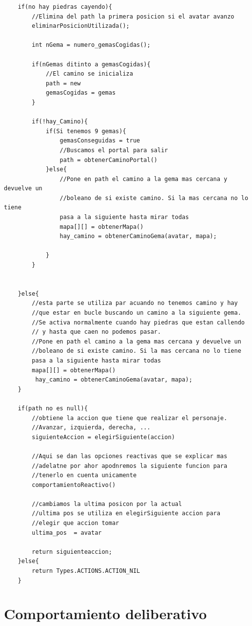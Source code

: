 \documentclass[titlepage]{article}
\begin{document}
	\begin{lstlisting}
	if(no hay piedras cayendo){
		//Elimina del path la primera posicion si el avatar avanzo
		eliminarPosicionUtilizada();
		
		int nGema = numero_gemasCogidas();
		
		if(nGemas ditinto a gemasCogidas){
			//El camino se inicializa
			path = new
			gemasCogidas = gemas
		}
		
		if(!hay_Camino){
			if(Si tenemos 9 gemas){
				gemasConseguidas = true
				//Buscamos el portal para salir
				path = obtenerCaminoPortal()
			}else{
				//Pone en path el camino a la gema mas cercana y devuelve un 
				//boleano de si existe camino. Si la mas cercana no lo tiene
				pasa a la siguiente hasta mirar todas
				mapa[][] = obtenerMapa()
				hay_camino = obtenerCaminoGema(avatar, mapa);
				
			}
		}
		
		
	}else{
		//esta parte se utiliza par acuando no tenemos camino y hay 
		//que estar en bucle buscando un camino a la siguiente gema.
		//Se activa normalmente cuando hay piedras que estan callendo
		// y hasta que caen no podemos pasar.
		//Pone en path el camino a la gema mas cercana y devuelve un 
		//boleano de si existe camino. Si la mas cercana no lo tiene
		pasa a la siguiente hasta mirar todas
		mapa[][] = obtenerMapa()
		 hay_camino = obtenerCaminoGema(avatar, mapa);
	}
	
	if(path no es null){
		//obtiene la accion que tiene que realizar el personaje.
		//Avanzar, izquierda, derecha, ...
		siguienteAccion = elegirSiguiente(accion)
		
		//Aqui se dan las opciones reactivas que se explicar mas
		//adelatne por ahor apodnremos la siguiente funcion para
		//tenerlo en cuenta unicamente
		comportamientoReactivo()
		
		//cambiamos la ultima posicon por la actual
		//ultima pos se utiliza en elegirSiguiente accion para
		//elegir que accion tomar
		ultima_pos  = avatar
		
		return siguienteaccion;
	}else{
		return Types.ACTIONS.ACTION_NIL
	}
	\end{lstlisting}
	
	\section{Comportamiento deliberativo}
	
\end{document}
